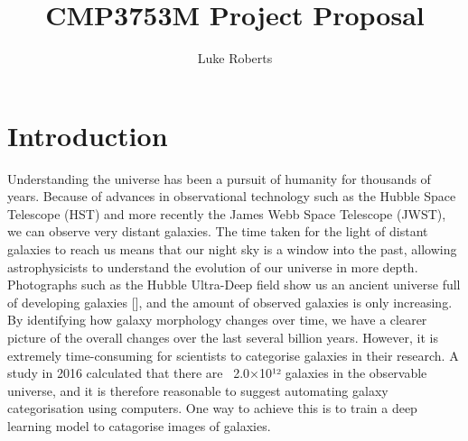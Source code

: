 \documentclass[runningheads]{llncs}
\begin{document}
\title{CMP3753M Project Proposal}

\author{Luke Roberts}


\maketitle

\section{Introduction}
%
%
%
%
%
Understanding the universe has been a pursuit of humanity for thousands of
years. Because of advances in observational technology such as the Hubble Space
Telescope (HST) and more recently the James Webb Space Telescope (JWST), we can
observe very distant galaxies. The time taken for the light of distant galaxies to
reach us means that our night sky is a window into the past, allowing
astrophysicists to understand the evolution of our universe in more depth. Photographs
such as the Hubble Ultra-Deep field show us an ancient universe full of developing
galaxies [], and the amount of observed galaxies is only increasing. By identifying
how galaxy morphology changes over time, we have a clearer picture of the
overall changes over the last several billion years. However, it is extremely
time-consuming for scientists to categorise galaxies in their research.
A study in 2016 \cite{article_1}calculated that there are ~2.0×10¹² galaxies in
the observable universe, and it is therefore reasonable to suggest automating
galaxy categorisation using computers. One way to achieve this is to train a
deep learning model to catagorise images of galaxies.
\end{document}
